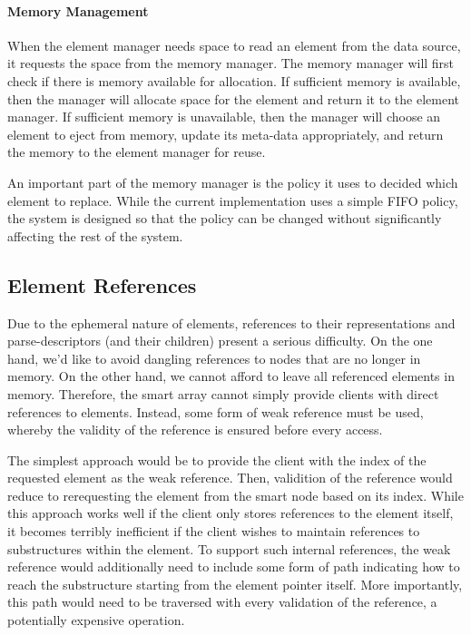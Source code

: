 \documentclass{article}
\begin{document}
\paragraph{Memory Management}

When the element manager needs space to read an element from the data
source, it requests the space from the memory manager. The memory
manager will first check if there is memory available for
allocation. If sufficient memory is available, then the manager will
allocate space for the element and return it to the element
manager. If sufficient memory is unavailable, then the manager will
choose an element to eject from memory, update its meta-data
appropriately, and return the memory to the element manager for reuse.

An important part of the memory manager is the policy it uses to
decided which element to replace. While the current implementation
uses a simple FIFO policy, the system is designed so that the policy
can be changed without significantly affecting the rest of the system.

\subsection{Element References}
\label{subsec:elt-refs}

Due to the ephemeral nature of elements, references to their
representations and parse-descriptors (and their children) present a
serious difficulty. On the one hand, we'd like to avoid dangling
references to nodes that are no longer in memory. On the other hand,
we cannot afford to leave all referenced elements in
memory. Therefore, the smart array cannot simply provide clients with
direct references to elements. Instead, some form of weak reference
must be used, whereby the validity of the reference is ensured before
every access.

The simplest approach would be to provide the client with the index of
the requested element as the weak reference. Then, validition of the
reference would reduce to rerequesting the element from the smart node
based on its index. While this approach works well if the client only
stores references to the element itself, it becomes terribly
inefficient if the client wishes to maintain references to
substructures within the element. To support such internal references,
the weak reference would additionally need to include some form of
path indicating how to reach the substructure starting from the
element pointer itself. More importantly, this path would need to be
traversed with every validation of the reference, a potentially
expensive operation.
\end{document}
